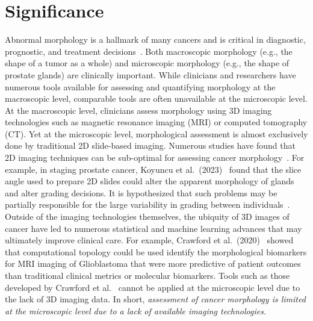 \documentclass{NIHGrant}
\theoremstyle{theorem}
\begin{document}
\section*{Significance}
Abnormal morphology is a hallmark of many cancers and is critical in
diagnostic, prognostic, and treatment decisions~\cite{kumar_robbins_2017}. Both macroscopic
morphology (e.g., the shape of a tumor as a whole) and microscopic morphology
(e.g., the shape of prostate glands) are clinically important. While
clinicians and researchers have numerous tools available for assessing and
quantifying morphology at the macroscopic level, comparable tools are often
unavailable at the microscopic level. At the macroscopic level, clinicians
assess morphology using 3D imaging technologies such as magnetic resonance
imaging (MRI) or computed tomography (CT). Yet at the microscopic level,
morphological assessment is almost exclusively done by traditional 2D
slide-based imaging. Numerous studies have found that 2D imaging techniques can be
sub-optimal for assessing cancer morphology~\cite{xie_prostate_2022,koyuncu_visual_2023,pinkert-leetsch_three-dimensional_2023}. For example, in staging
prostate cancer, Koyuncu et al.~(2023)~\cite{koyuncu_visual_2023}
found that the slice angle used to prepare 2D
slides could alter the apparent morphology of glands and alter grading
decisions. It is hypothesized that such problems may be partially
responsible for the large variability in grading between individuals~\cite{ozkan_interobserver_2016}.
Outside of the imaging technologies themselves, the ubiquity of 3D images of
cancer have led to numerous statistical and machine learning advances that may
ultimately improve clinical care. For example, Crawford et al.~(2020)~\cite{crawford_predicting_2020} showed that
computational topology could be used identify the morphological biomarkers for
MRI imaging of Glioblastoma that were more predictive of patient outcomes than
traditional clinical metrics or molecular biomarkers. Tools such
as those developed by Crawford et al.~\cite{lawson_persistent_2019,crawford_predicting_2020} cannot be applied at the
microscopic level due to the lack of 3D imaging data. In short,
\emph{assessment of cancer morphology is limited at the microscopic level due
  to a lack of available imaging technologies}.
\end{document}
